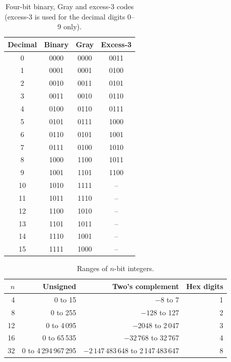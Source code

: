 \begin{table}[htbp]
\centering
\small
\caption{Four-bit binary, Gray and excess-3 codes (excess-3 is used for the decimal digits 0--9 only).}
\begin{tabular}{cccc}
\toprule Decimal & Binary & Gray & Excess-3\\ \midrule
0&0000&0000&0011\\
1&0001&0001&0100\\
2&0010&0011&0101\\
3&0011&0010&0110\\
4&0100&0110&0111\\
5&0101&0111&1000\\
6&0110&0101&1001\\
7&0111&0100&1010\\
8&1000&1100&1011\\
9&1001&1101&1100\\
10&1010&1111&--\\
11&1011&1110&--\\
12&1100&1010&--\\
13&1101&1011&--\\
14&1110&1001&--\\
15&1111&1000&--\\
\bottomrule
\end{tabular}
\end{table}

\begin{table}[htbp]
\centering
\small
\caption{Ranges of $n$-bit integers.}
\begin{tabular}{rrrr}
\toprule $n$ & Unsigned & Two's complement & Hex digits\\ \midrule
4&0 to 15&$-8$ to 7&1\\8&0 to 255&$-128$ to 127&2\\12&0 to 4\,095&$-2048$ to 2\,047&3\\16&0 to 65\,535&$-32\,768$ to 32\,767&4\\32&0 to 4\,294\,967\,295&$-2\,147\,483\,648$ to 2\,147\,483\,647&8\\ \bottomrule
\end{tabular}
\end{table}

